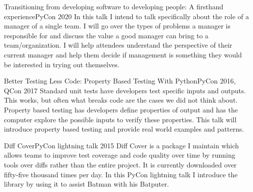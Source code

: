 
\begin{talks}

	\talk
	{Transitioning from developing software to developing people: A firsthand experience}{PyCon 2020}
	{In this talk I intend to talk specifically about the role of a manager of a single team. I will go over the types of problems a manager is responsible for and discuss the value a good manager can bring to a team/organization. I will help attendees understand the perspective of their current manager and help them decide if management is something they would be interested in trying out themselves.}

	\talk
	{Better Testing Less Code: Property Based Testing With Python}{PyCon 2016, QCon 2017}
	{Standard unit tests have developers test specific inputs and outputs. This works, but often what breaks code are the cases we did not think about. Property based testing has developers define properties of output and has the computer explore the possible inputs to verify these properties. This talk will introduce property based testing and provide real world examples and patterns.}

	\talk
	{Diff Cover}{PyCon lightning talk 2015}
	{Diff Cover is a package I maintain which allows teams to improve test coverage and code quality over time by running tools over diffs rather than the entire project. It is currently downloaded over fifty-five thousand times per day. In this PyCon lightning talk I introduce the library by using it to assist Batman with his Batputer.}

\end{talks}